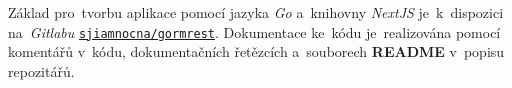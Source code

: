 \documentclass[11pt,a4paper]{report}
\begin{document}
        Základ pro~tvorbu aplikace pomocí jazyka \emph{Go} a~knihovny \emph{NextJS} je~k~dispozici na~\emph{Gitlabu} \href{https://gitlab.com/sjiamnocna/gormrest}{\texttt{sjiamnocna/gormrest}}. Dokumentace ke~kódu je~realizována pomocí komentářů v~kódu, dokumentačních řetězcích a~souborech \textbf{README} v~popisu repozitářů.

    \clearpage
    
    \printbibliography[title={Použitá literatura}]
\end{document}
